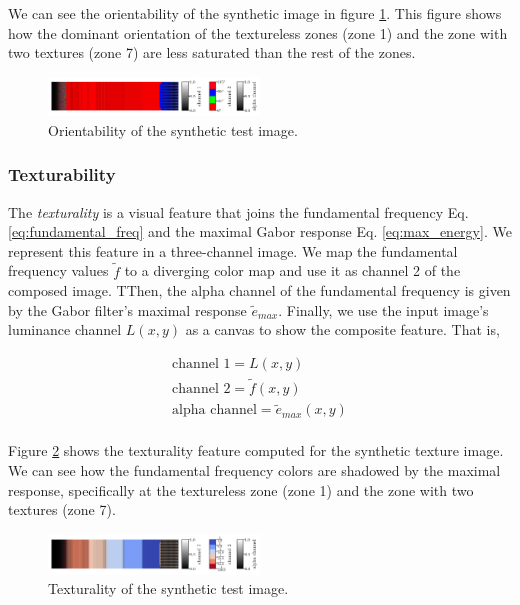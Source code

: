 \documentclass[journal]{IEEEtran}
\begin{document}
We can see the orientability of the synthetic image in figure \ref{fig:orientability_synth}. This figure shows how the dominant orientation of the textureless zones (zone 1) and the zone with two textures (zone 7) are less saturated than the rest of the zones. 

\begin{figure}[!ht]
	\includegraphics[width=0.5\textwidth]{orientability_synth}
    \caption{Orientability of the synthetic test image.}
    \label{fig:orientability_synth}
\end{figure}

\subsubsection{Texturability}
The \textit{texturality} is a visual feature that joins the fundamental frequency Eq. \eqref{eq:fundamental_freq} and the maximal Gabor response Eq. \eqref{eq:max_energy}. We represent this feature in a three-channel image. We map the fundamental frequency values $\widetilde{f}$ to a diverging color map and use it as channel 2 of the composed image. TThen, the alpha channel of the fundamental frequency is given by the Gabor filter's maximal response $\widetilde{e}_{max}$. Finally, we use the input image's luminance channel $L(x,y)$ as a canvas to show the composite feature. That is,

\begin{gather}
    \text{channel 1} = L(x,y) \\
    \text{channel 2} = \widetilde{f}(x,y) \\
    \text{alpha channel} = \widetilde{e}_{max}(x,y) \\
\end{gather}

Figure \ref{fig:texturality_synth} shows the texturality feature computed for the synthetic texture image. We can see how the fundamental frequency colors are shadowed by the maximal response, specifically at the textureless zone (zone 1) and the zone with two textures (zone 7).

\begin{figure}[!ht]
	\includegraphics[width=0.5\textwidth]{texturality_synth}
    \caption{Texturality of the synthetic test image.}
    \label{fig:texturality_synth}
\end{figure}
\end{document}
